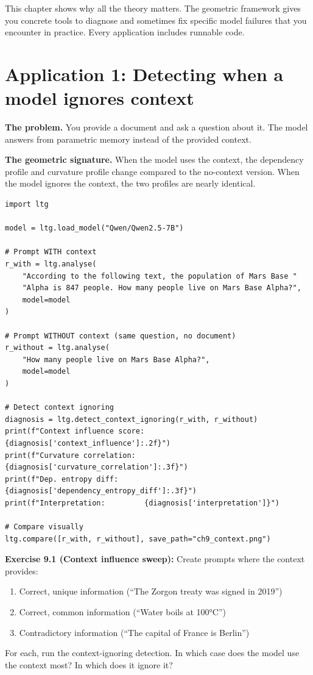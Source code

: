 \documentclass[11pt, twoside, openright]{memoir}
\begin{document}
\begin{whycare}
This chapter shows why all the theory matters. The geometric framework gives
you concrete tools to diagnose and sometimes fix specific model failures
that you encounter in practice. Every application includes runnable code.
\end{whycare}

\section{Application 1: Detecting when a model ignores context}

\textbf{The problem.} You provide a document and ask a question about it.
The model answers from parametric memory instead of the provided context.

\textbf{The geometric signature.} When the model uses the context, the
dependency profile and curvature profile change compared to the no-context
version. When the model ignores the context, the two profiles are nearly
identical.

\begin{lstlisting}[caption={Detecting context-ignoring with ltg}]
import ltg

model = ltg.load_model("Qwen/Qwen2.5-7B")

# Prompt WITH context
r_with = ltg.analyse(
    "According to the following text, the population of Mars Base "
    "Alpha is 847 people. How many people live on Mars Base Alpha?",
    model=model
)

# Prompt WITHOUT context (same question, no document)
r_without = ltg.analyse(
    "How many people live on Mars Base Alpha?",
    model=model
)

# Detect context ignoring
diagnosis = ltg.detect_context_ignoring(r_with, r_without)
print(f"Context influence score: {diagnosis['context_influence']:.2f}")
print(f"Curvature correlation:  {diagnosis['curvature_correlation']:.3f}")
print(f"Dep. entropy diff:      {diagnosis['dependency_entropy_diff']:.3f}")
print(f"Interpretation:         {diagnosis['interpretation']}")

# Compare visually
ltg.compare([r_with, r_without], save_path="ch9_context.png")
\end{lstlisting}

\begin{tryit}
\textbf{Exercise 9.1 (Context influence sweep):} Create prompts where the
context provides:
\begin{enumerate}[nosep]
\item[a)] Correct, unique information (``The Zorgon treaty was signed in 2019'')
\item[b)] Correct, common information (``Water boils at 100°C'')
\item[c)] Contradictory information (``The capital of France is Berlin'')
\end{enumerate}
For each, run the context-ignoring detection. In which case does the model
use the context most? In which does it ignore it?
\end{tryit}
\end{document}
